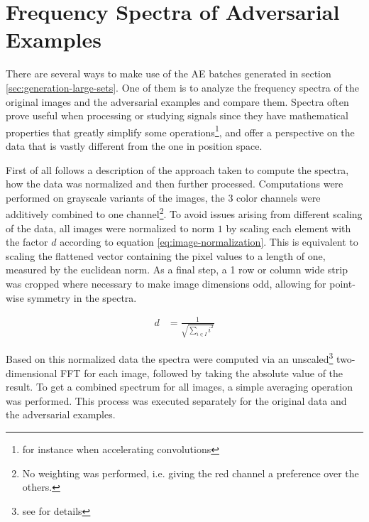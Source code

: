 \documentclass[11pt, a4paper]{article}
\begin{document}









\section{Frequency Spectra of Adversarial Examples}
\label{sec:spectra}
There are several ways to make use of the AE batches generated in section \ref{sec:generation-large-sets}. One of them is to analyze the frequency spectra of the original images and the adversarial examples and compare them. Spectra often prove useful when processing or studying signals since they have mathematical properties that greatly simplify some operations\footnote{for instance when accelerating convolutions}, and offer a perspective on the data that is vastly different from the one in position space.

First of all follows a description of the approach taken to compute the spectra, how the data was normalized and then further processed. Computations were performed on grayscale variants of the images, the 3 color channels were additively combined to one channel\footnote{No weighting was performed, i.e. giving the red channel a preference over the others.}. To avoid issues arising from different scaling of the data, all images were normalized to norm $1$ by scaling each element with the factor $d$ according to equation \eqref{eq:image-normalization}. This is equivalent to scaling the flattened vector containing the pixel values to a length of one, measured by the euclidean norm. As a final step, a 1 row or column wide strip was cropped where necessary to make image dimensions odd, allowing for point-wise symmetry in the spectra.

\begin{align}
	d &= \frac{1}{\displaystyle \sqrt{\sum_{i \in I}{i^2}}} \label{eq:image-normalization}
\end{align}

Based on this normalized data the spectra were computed via an unscaled\footnote{see \cite{numpy-fft} for details} two-dimensional FFT for each image, followed by taking the absolute value of the result. To get a combined spectrum for all images, a simple averaging operation was performed. This process was executed separately for the original data and the adversarial examples.
\end{document}
